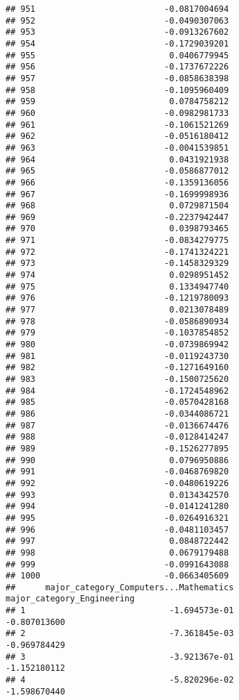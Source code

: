 \documentclass[
]{article}
\begin{document}
\begin{verbatim}
## 951                          -0.0817004694
## 952                          -0.0490307063
## 953                          -0.0913267602
## 954                          -0.1729039201
## 955                           0.0406779945
## 956                          -0.1737672226
## 957                          -0.0858638398
## 958                          -0.1095960409
## 959                           0.0784758212
## 960                          -0.0982981733
## 961                          -0.1061521269
## 962                          -0.0516180412
## 963                          -0.0041539851
## 964                           0.0431921938
## 965                          -0.0586877012
## 966                          -0.1359136056
## 967                          -0.1699998936
## 968                           0.0729871504
## 969                          -0.2237942447
## 970                           0.0398793465
## 971                          -0.0834279775
## 972                          -0.1741324221
## 973                          -0.1458329329
## 974                           0.0298951452
## 975                           0.1334947740
## 976                          -0.1219780093
## 977                           0.0213078489
## 978                          -0.0586890934
## 979                          -0.1037854852
## 980                          -0.0739869942
## 981                          -0.0119243730
## 982                          -0.1271649160
## 983                          -0.1500725620
## 984                          -0.1724548962
## 985                          -0.0570428168
## 986                          -0.0344086721
## 987                          -0.0136674476
## 988                          -0.0128414247
## 989                          -0.1526277895
## 990                           0.0796950886
## 991                          -0.0468769820
## 992                          -0.0480619226
## 993                           0.0134342570
## 994                          -0.0141241280
## 995                          -0.0264916321
## 996                          -0.0481103457
## 997                           0.0848722442
## 998                           0.0679179488
## 999                          -0.0991643088
## 1000                         -0.0663405609
##      major_category_Computers...Mathematics major_category_Engineering
## 1                             -1.694573e-01               -0.807013600
## 2                             -7.361845e-03               -0.969784429
## 3                             -3.921367e-01               -1.152180112
## 4                             -5.820296e-02               -1.598670440

\end{verbatim}
\end{document}
